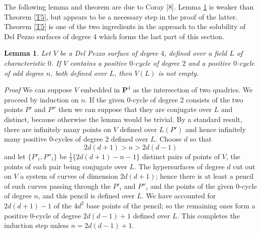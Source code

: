 \documentclass[12pt]{article}
\def\bP{{\mathbf P}}
\def\ble{\begin{lemma} \label}
\def\ele{\end{lemma}}
\newtheorem{lemma}{Lemma}
\def\half{{\textstyle{\frac{1}{2}}}}
\begin{document}
The following lemma and theorem are due to Coray [8].
Lemma \ref{L8} is weaker than Theorem \ref{T5}, but appears
to be a necessary step in the proof of the latter. Theorem
\ref{T5} is one of the two ingredients in the approach to the
solubility of Del Pezzo surfaces of degree 4 which forms the
last part of this section.
\ble{L8} Let $V$ be a Del Pezzo surface of degree $4$, defined over a field
$L$ of characteristic $0$. If $V$ contains a positive $0$-cycle of degree
$2$ and a positive $0$-cycle of odd degree $n$, both defined over $L$, then
$V(L)$ is not empty.
\ele
\emph{Proof} We can suppose $V$ embedded in $\bP^4$ as the intersection of two
quadrics. We proceed by induction on $n$. If the given 0-cycle of degree 2
consists of the two points $P'$ and $P''$ then we can suppose that they are
conjugate over $L$ and distinct, because otherwise the lemma would be trivial.
By a standard result, there are infinitely many points on $V$ defined over
$L(P')$ and hence infinitely many positive 0-cycles of degree 2 defined over
$L$. Choose $d$ so that
\[ 2d(d+1)>n>2d(d-1) \]
and let $\{P'_i,P''_i\}$ be $\half\{2d(d+1)-n-1\}$ distinct pairs of points
of $V$, the points of each pair being conjugate over $L$. The hypersurfaces
of degree $d$ cut out on $V$ a system of curves of dimension $2d(d+1)$; hence
there is at least a pencil of such curves passing through the $P'_i$ and
$P''_i$ and the points of the given 0-cycle of degree $n$, and this pencil is
defined over $L$. We have accounted for $2d(d+1)-1$ of the $4d^2$ base points
of the pencil; so the remaining ones form a positive 0-cycle of degree
$2d(d-1)+1$ defined over $L$. This completes the induction step unless
$n=2d(d-1)+1$.
\end{document}
